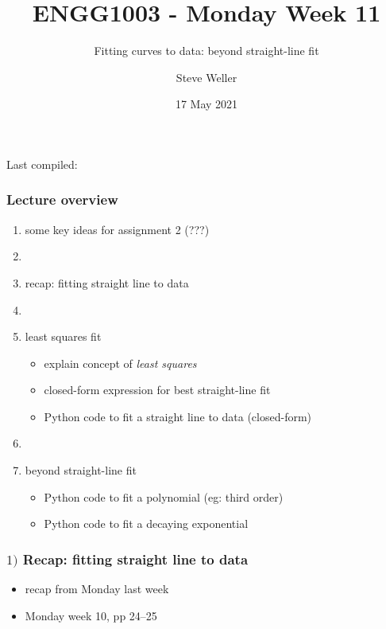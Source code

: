 \documentclass[english,14pt]{beamer}
\title{ENGG1003 - Monday Week 11}
\subtitle{Fitting curves to data: beyond straight-line fit}%
\author{Steve Weller}
\institute{University of Newcastle}
\date{17 May 2021}
\begin{document}
\begin{flushleft}
{\scriptsize Last compiled:~\DTMnow}
\vspace*{-5mm}
\end{flushleft}
\framebreak


\begin{frame}[fragile]

\frametitle{Lecture overview}
\begin{enumerate}
	\item some key ideas for assignment 2 (???)
	\item[]
	\item recap: fitting straight line to data
	\item[]
	\item least squares fit
		\begin{itemize}
			\item explain concept of \emph{least squares}
			\item closed-form expression for best straight-line fit
			\item Python code to fit a straight line to data (closed-form)
		\end{itemize}	
	\item[]
	\item beyond straight-line fit
		\begin{itemize}
			\item Python code to fit a polynomial (eg: third order)
			\item Python code to fit a decaying exponential
		\end{itemize}	

\end{enumerate}

\end{frame}


\begin{frame}[fragile]

\frametitle{$1)$ Recap: fitting straight line to data}

\begin{itemize}
	\item recap from Monday last week
	\item Monday week 10, pp 24--25
\end{itemize}

\end{frame}
\end{document}
